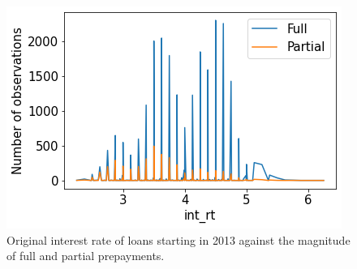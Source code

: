     \begin{figure}[H]
        \centering
        \includegraphics[width=0.6\linewidth]{Figures/int_rt againts Full and Partial prepayments.png}
        \caption{Original interest rate of loans starting in 2013 against the magnitude of full and partial prepayments.}
        \label{model_int_rt_against_prepayment}
    \end{figure}
        
